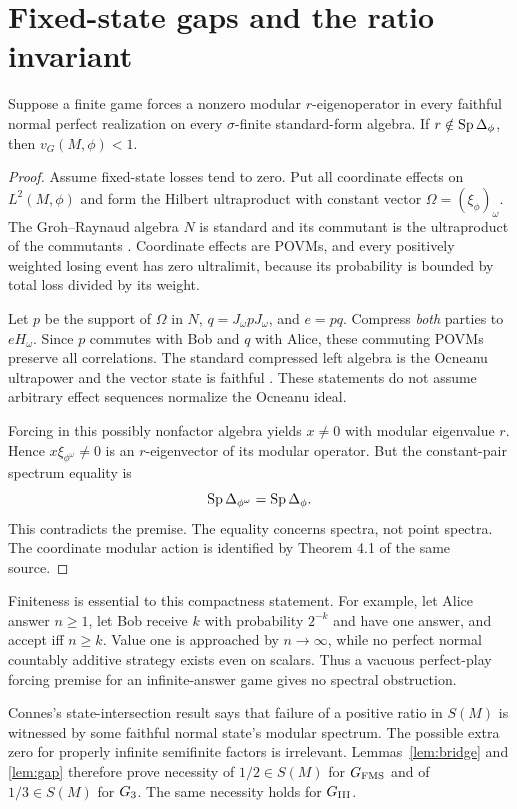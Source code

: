 \section{Fixed-state gaps and the ratio invariant}\label{sec:states}
\begin{lemma}\label{lem:gap}
Suppose a finite game forces a nonzero modular $r$-eigenoperator in every faithful normal perfect realization on every $\sigma$-finite standard-form algebra. If $r\notin\operatorname{Sp}\Delta_\phi$, then $v_G(M,\phi)<1$.
\end{lemma}
\begin{proof}
Assume fixed-state losses tend to zero. Put all coordinate effects on $L^2(M,\phi)$ and form the Hilbert ultraproduct with constant vector $\Omega=(\xi_\phi)_\omega$. The Groh--Raynaud algebra $N$ is standard and its commutant is the ultraproduct of the commutants \cite[Theorems 3.18 and 3.22]{AH}. Coordinate effects are POVMs, and every positively weighted losing event has zero ultralimit, because its probability is bounded by total loss divided by its weight.

Let $p$ be the support of $\Omega$ in $N$, $q=J_\omega pJ_\omega$, and $e=pq$. Compress \emph{both} parties to $eH_\omega$. Since $p$ commutes with Bob and $q$ with Alice, these commuting POVMs preserve all correlations. The standard compressed left algebra is the Ocneanu ultrapower and the vector state is faithful \cite[Theorem 3.7 and Corollary 3.28]{AH}. These statements do not assume arbitrary effect sequences normalize the Ocneanu ideal.

Forcing in this possibly nonfactor algebra yields $x\ne0$ with modular eigenvalue $r$. Hence $x\xi_{\phi^\omega}\ne0$ is an $r$-eigenvector of its modular operator. But the constant-pair spectrum equality \cite[Corollary 4.8(3)]{AH} is
\[
 \operatorname{Sp}\Delta_{\phi^\omega}=\operatorname{Sp}\Delta_\phi.
\]
This contradicts the premise. The equality concerns spectra, not point spectra. The coordinate modular action is identified by Theorem 4.1 of the same source.
\end{proof}
Finiteness is essential to this compactness statement. For example, let Alice answer $n\ge1$, let Bob receive $k$ with probability $2^{-k}$ and have one answer, and accept iff $n\ge k$. Value one is approached by $n\to\infty$, while no perfect normal countably additive strategy exists even on scalars. Thus a vacuous perfect-play forcing premise for an infinite-answer game gives no spectral obstruction.

Connes's state-intersection result \cite[Corollary 3.2.5(d)]{Connes} says that failure of a positive ratio in $S(M)$ is witnessed by some faithful normal state's modular spectrum. The possible extra zero for properly infinite semifinite factors is irrelevant. Lemmas~\ref{lem:bridge} and \ref{lem:gap} therefore prove necessity of $1/2\in S(M)$ for $G_{\mathrm{FMS}}$ and of $1/3\in S(M)$ for $G_3$. The same necessity holds for $G_{\mathrm{III}}$.

